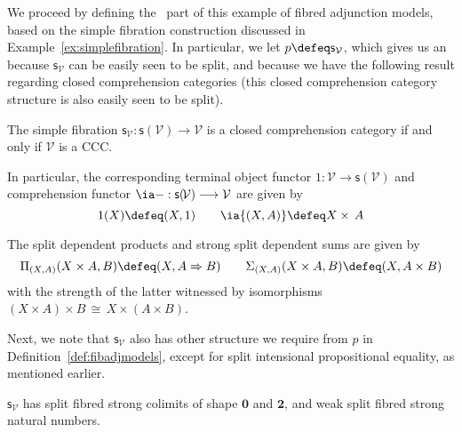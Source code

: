 We proceed by defining the \SCCompC\, part of this example of fibred adjunction models, based on the simple fibration construction discussed in Example~\ref{ex:simplefibration}. In particular, we let $p \defeq \mathsf{s}_{\mathcal{V}}$, which gives us an \SCCompC\, because $\mathsf{s}_{\mathcal{V}}$ can be easily seen to be split, and because we have the following result regarding closed comprehension categories (this closed comprehension category structure is also easily seen to be split).

\begin{proposition}
The simple fibration $\mathsf{s}_{\mathcal{V}} : \mathsf{s}(\!\mathcal{V}) \longrightarrow \mathcal{V}$ is a closed comprehension category if and only if $\mathcal{V}$ is a CCC.
\end{proposition}


In particular, the corresponding terminal object functor $1 : \mathcal{V} \longrightarrow \mathsf{s}(\!\mathcal{V})$ and comprehension functor $\ia - : \mathsf{s}(\!\mathcal{V}) \longrightarrow \mathcal{V}$ are given by
\[
1(X) \defeq (X,1)
\qquad
\ia {(X,A)} \defeq X \times\, A
\]

The split dependent products and strong split dependent sums are given by 
\[
\Pi_{(X,A)}(X \times A,B) \defeq (X, A \Rightarrow B)
\qquad
\Sigma_{(X,A)}(X \times A, B) \defeq (X, A \times B)
\]
with the strength of the latter witnessed by isomorphisms $(X \times A) \times B \,\cong\, X \times (A \times B)$. 

Next, we note that $\mathsf{s}_{\mathcal{V}}$ also has other structure we require from $p$ in Definition~\ref{def:fibadjmodels}, except for split intensional propositional equality, as mentioned earlier.


\begin{proposition}
$\mathsf{s}_{\mathcal{V}}$ has split fibred strong colimits of shape $\mathbf{0}$ and $\mathbf{2}$, and weak split fibred strong natural numbers.
\end{proposition}


